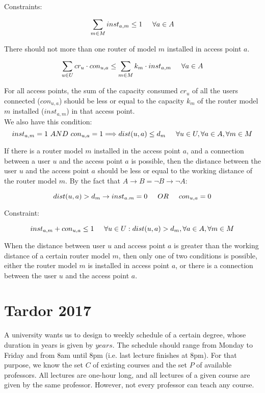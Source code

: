 \documentclass[11pt, oneside]{article}   	%
\begin{document}
Constraints:

$$\sum_{m \in M} inst_{a,m} \leq 1 \hspace{5 mm} \forall a \in A$$

There should not more than one router of model $m$ installed in access point $a$.

$$\sum_{u \in U} cr_u \cdot con_{u,a} \leq \sum_{m \in M} k_m \cdot inst_{a,m} \hspace{5 mm} \forall a \in A$$

For all access points, the sum of the capacity consumed $cr_u$ of all the users connected ($con_{u,a}$) should be less or equal to the capacity $k_m$ of the router model $m$ installed ($inst_{a,m}$) in that access point.\\

We also have this condition:\\

$$inst_{a,m} = 1 \ AND \ con_{u,a} = 1 \Longrightarrow dist(u,a) \leq d_m \hspace{5 mm} \forall u \in U, \forall a \in A, \forall m \in M$$

If there is a router model $m$ installed in the access point $a$, and a connection between a user $u$ and the access point $a$ is possible, then the distance between the user $u$ and the access point $a$ should be less or equal to the working distance of the router model $m$. By the fact that $A \rightarrow B = \neg B \rightarrow \neg A$:

$$dist(u,a) > d_m \rightarrow inst_{a.m} = 0 \hspace{5 mm} OR \hspace{5 mm} con_{u,a} = 0$$

Constraint:

$$inst_{a,m} + con_{u,a} \leq 1 \hspace{5 mm} \forall u \in U : dist(u,a) > d_m, \forall a \in A, \forall m \in M$$

When the distance between user $u$ and access point $a$ is greater than the working distance of a certain router model $m$, then only one of two conditions is possible, either the router model $m$ is installed in access point $a$, or there is a connection between the user $u$ and the access point $a$.

\section{Tardor 2017}

A university wants us to design to weekly schedule of a certain degree, whose duration in years is given by $years$. The schedule should range from Monday to Friday and from 8am until 8pm (i.e. last lecture finishes at 8pm). For that purpose, we know the set $C$ of existing courses and the set $P$ of available professors. All lectures are one-hour long, and all lectures of a given course are given by the same professor. However, not every professor can teach any course.
\end{document}
